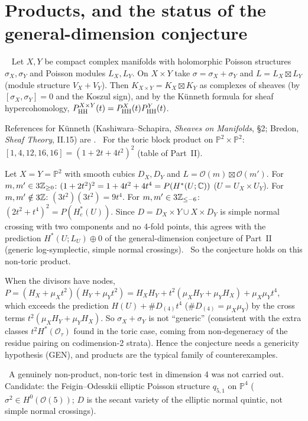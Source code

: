 \section{Products, and the status of the general-dimension conjecture}\label{p3:sec:prod}
\begin{prop}[K\"unneth]\tP\ \tQ\label{p3:prop:Kunneth}
Let $X,Y$ be compact complex manifolds with holomorphic Poisson structures $\sigma_X,\sigma_Y$ and Poisson modules $L_X,L_Y$. On $X\times Y$ take $\sigma=\sigma_X+\sigma_Y$ and $L=L_X\boxtimes L_Y$ (module structure $V_X+V_Y$). Then $K_{X\times Y}=K_X\boxtimes K_Y$ as complexes of sheaves (by $[\sigma_X,\sigma_Y]=0$ and the Koszul sign), and by the K\"unneth formula for sheaf hypercohomology, $P^{X\times Y}_{\mathrm{HH}}(t)=P^X_{\mathrm{HH}}(t)P^Y_{\mathrm{HH}}(t)$.
\end{prop}
\noindent References for K\"unneth (Kashiwara--Schapira, \emph{Sheaves on Manifolds}, \S2; Bredon, \emph{Sheaf Theory}, II.15) are \tQ. \tV\ For the toric block product on $\mathbb P^2\times\mathbb P^2$: $[1,4,12,16,16]=(1+2t+4t^2)^2$ (table of Part~II).
\begin{ex}\tP\label{p3:ex:prod33}
Let $X=Y=\mathbb P^2$ with smooth cubics $D_X,D_Y$ and $L=\mathcal O(m)\boxtimes\mathcal O(m')$. For $m,m'\in3\mathbb Z_{\ge0}$: $(1+2t^2)^2=1+4t^2+4t^4=P(H^*(U;\mathbb C))$ ($U=U_X\times U_Y$). For $m,m'\notin3\mathbb Z$: $(3t^2)(3t^2)=9t^4$. For $m,m'\in3\mathbb Z_{\le-6}$: $(2t^2+t^4)^2=P(H_c^*(U))$. Since $D=D_X\times Y\cup X\times D_Y$ is simple normal crossing with two components and no 4-fold points, this agrees with the prediction $H^*(U;L_U)\oplus0$ of the general-dimension conjecture of Part~II (generic log-symplectic, simple normal crossings). \tP\ So the conjecture holds on this non-toric product.
\end{ex}
\begin{rem}\tP
When the divisors have nodes, $P=(H_X+\mu_Xt^2)(H_Y+\mu_Yt^2)=H_XH_Y+t^2(\mu_XH_Y+\mu_YH_X)+\mu_X\mu_Yt^4$, which exceeds the prediction $H(U)+\#D_{(4)}t^4$ ($\#D_{(4)}=\mu_X\mu_Y$) by the cross terms $t^2(\mu_XH_Y+\mu_YH_X)$. So $\sigma_X+\sigma_Y$ is not ``generic'' (consistent with the extra classes $t^2H^*(\mathcal O_\tau)$ found in the toric case, coming from non-degeneracy of the residue pairing on codimension-2 strata). Hence the conjecture needs a genericity hypothesis (GEN), and products are the typical family of counterexamples.
\end{rem}
\noindent \tK\ A genuinely non-product, non-toric test in dimension 4 was not carried out. Candidate: the Feigin--Odesskii elliptic Poisson structure $q_{5,1}$ on $\mathbb P^4$ ($\sigma^2\in H^0(\mathcal O(5))$; $D$ is the secant variety of the elliptic normal quintic, not simple normal crossings).

